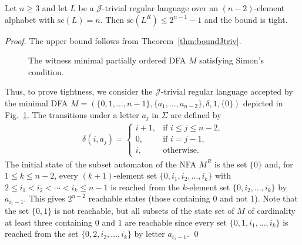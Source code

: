 \documentclass[runningheads]{llncs}
\newcommand{\J}{$\mathcal{J}$}
\renewcommand{\sc}{\mathrm{sc}}
\begin{document}
  \begin{theorem}\label{thm3}
    Let $n\ge3$ and let $L$ be a \J-trivial regular language
    over an $(n-2)$-element alphabet with  $\sc(L)=n$.
    Then $\sc(L^R)\le 2^{n-1}-1$ and the bound is tight.
  \end{theorem}
  \begin{proof}
    The upper bound follows from Theorem~\ref{thm:boundJtriv}.
    \begin{figure}[t]
      \centering
      \caption{The witness minimal partially ordered DFA $M$ satisfying Simon's condition.}
      \label{fig:n2witness}
    \end{figure}
    Thus, to prove tightness, we consider 
    the \J-trivial regular language accepted by the minimal DFA 
    $M = (\{0,1,\ldots,n-1\},\{a_1,\ldots,a_{n-2}\},\delta,1,\{0\})$
    depicted in Fig.~\ref{fig:n2witness}.
    The transitions under a letter $a_j$ in $\Sigma$ are defined by
    \begin{eqnarray*} 
    \delta(i,a_j)= \left\{\begin{array}{ll}
                    i+1, & \text{if $i\le j\le n-2$,} \\
                    0,   & \text{if $i = j-1$,} \\
                    i,   & \text{otherwise.}
                  \end{array}\right.
    \end{eqnarray*}
    The initial state of the subset automaton of the NFA $M^R$ is the set $\{0\}$ and, for $1\le k\le n-2$, 
    every $(k+1)$-element set $\{0,i_1,i_2,\ldots,i_k\}$ 
    with $2\le i_1<i_2<\cdots<i_k\le n-1$ 
    is reached from the $k$-element set $\{0,i_2,\ldots,i_k\}$ by $a_{i_1-1}$.
    This gives $2^{n-2}$ reachable states (those containing 0 and not 1).
    Note that the set $\{0,1\}$ is not reachable,
    but all subsets of the state set of $M$ of cardinality at least three containing $0$ and $1$
    are reachable
    since every set $\{0 ,1,i_1,\ldots,i_k\}$ is reached from the set
    $\{0,2,i_2,\ldots,i_k\}$ by letter $a_{i_1-1}$.
    \qed
  \end{proof}
\end{document}
